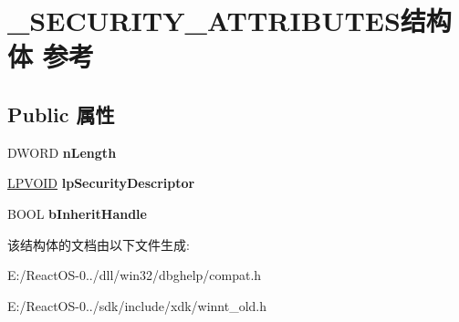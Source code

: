 \hypertarget{struct___s_e_c_u_r_i_t_y___a_t_t_r_i_b_u_t_e_s}{}\section{\+\_\+\+S\+E\+C\+U\+R\+I\+T\+Y\+\_\+\+A\+T\+T\+R\+I\+B\+U\+T\+E\+S结构体 参考}
\label{struct___s_e_c_u_r_i_t_y___a_t_t_r_i_b_u_t_e_s}
\subsection*{Public 属性}
\begin{DoxyCompactItemize}
\item 
\mbox{\label{struct___s_e_c_u_r_i_t_y___a_t_t_r_i_b_u_t_e_s_a3ec25c40b65a92b164177b0b230abda9}} 
D\+W\+O\+RD {\bfseries n\+Length}
\item 
\mbox{\label{struct___s_e_c_u_r_i_t_y___a_t_t_r_i_b_u_t_e_s_a90d1d49f7d2d50b24cc74c5060ae6204}} 
\hyperlink{interfacevoid}{L\+P\+V\+O\+ID} {\bfseries lp\+Security\+Descriptor}
\item 
\mbox{\label{struct___s_e_c_u_r_i_t_y___a_t_t_r_i_b_u_t_e_s_a8d91cd71bb0dfe51061c2412849dff98}} 
B\+O\+OL {\bfseries b\+Inherit\+Handle}
\end{DoxyCompactItemize}


该结构体的文档由以下文件生成\+:\begin{DoxyCompactItemize}
\item 
E\+:/\+React\+O\+S-\/0../dll/win32/dbghelp/compat.\+h\item 
E\+:/\+React\+O\+S-\/0../sdk/include/xdk/winnt\+\_\+old.\+h\end{DoxyCompactItemize}

